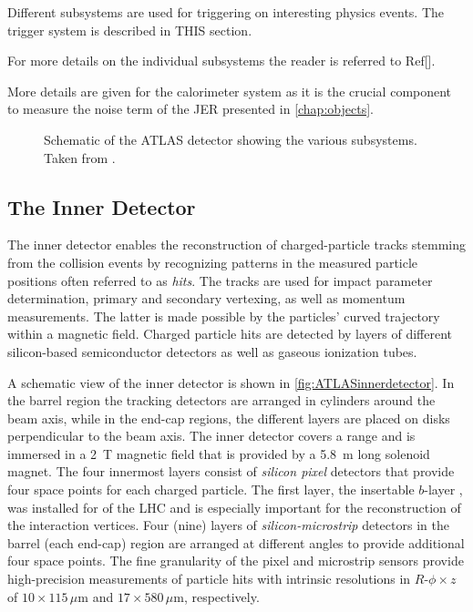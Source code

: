 Different subsystems are used for triggering on interesting physics events. The trigger system is described in THIS section.

For more details on the individual subsystems the reader is referred to Ref[].

More details are given for the calorimeter system as it is the crucial component to measure the noise term of the JER presented in \cref{chap:objects}.




\begin{figure}
    \caption[Schematic of the ATLAS detector showing the various subsystems.]{Schematic of the ATLAS detector showing the various subsystems. Taken from .}
    \label{fig:ATLASlayout}
\end{figure}

\subsection{The Inner Detector}
\label{subsec:inner-detector}
The inner detector enables the reconstruction of charged-particle tracks stemming from the collision events by recognizing patterns in the measured particle positions often referred to as \emph{hits}. The tracks are used for impact parameter determination, primary and secondary vertexing, as well as momentum measurements. The latter is made possible by the particles' curved trajectory within a magnetic field.
Charged particle hits are detected by layers of different silicon-based semiconductor detectors as well as gaseous ionization tubes.

A schematic view of the inner detector is shown in \cref{fig:ATLASinnerdetector}.
In the barrel region the tracking detectors are arranged in cylinders around the beam axis, while in the end-cap regions, the different layers are placed on disks perpendicular to the beam axis.
The inner detector covers a range  and is immersed in a \SI{2}{\tesla} magnetic field that is provided by a \SI{5.8}{\m} long solenoid magnet.
The four innermost layers consist of \emph{silicon pixel} detectors that provide four space points for each charged particle. The first layer, the insertable $b$-layer \cite{ATLAS-TDR-19,PIX-2018-001}, was installed for \RunTwo of the LHC and is especially important for the reconstruction of the interaction vertices.
Four (nine) layers of \emph{silicon-microstrip} detectors in the barrel (each end-cap) region are arranged at different angles to provide additional four space points.
The fine granularity of the pixel and microstrip sensors provide high-precision measurements of particle hits with intrinsic resolutions in $R$-$\phi \times z$ of $10 \times 115\,\mu\text{m}$ and $17 \times 580\,\mu\text{m}$, respectively.

